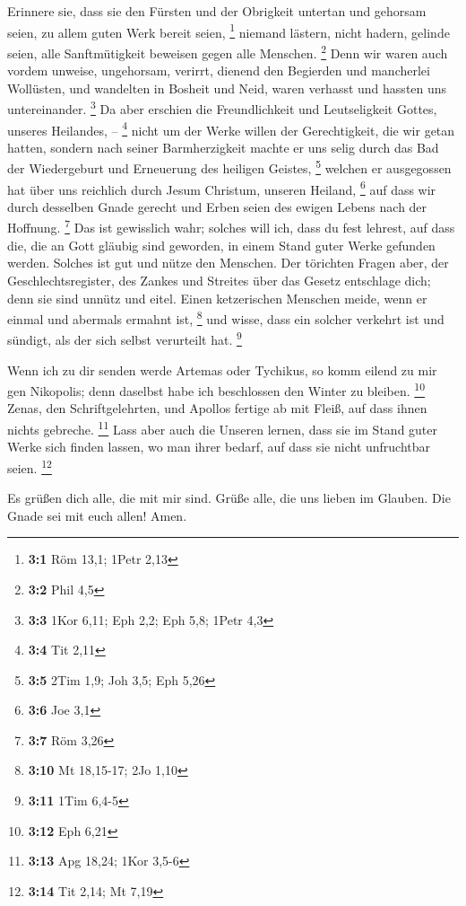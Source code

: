  Erinnere sie, dass sie den Fürsten und der Obrigkeit
untertan und gehorsam seien, zu allem guten Werk bereit seien,
\footnote{\textbf{3:1} Röm 13,1; 1Petr 2,13}  niemand
lästern, nicht hadern, gelinde seien, alle Sanftmütigkeit beweisen gegen
alle Menschen. \footnote{\textbf{3:2} Phil 4,5}  Denn wir
waren auch vordem unweise, ungehorsam, verirrt, dienend den Begierden
und mancherlei Wollüsten, und wandelten in Bosheit und Neid, waren
verhasst und hassten uns untereinander. \footnote{\textbf{3:3} 1Kor
  6,11; Eph 2,2; Eph 5,8; 1Petr 4,3}  Da aber erschien die
Freundlichkeit und Leutseligkeit Gottes, unseres Heilandes, --
\footnote{\textbf{3:4} Tit 2,11}  nicht um der Werke willen
der Gerechtigkeit, die wir getan hatten, sondern nach seiner
Barmherzigkeit machte er uns selig durch das Bad der Wiedergeburt und
Erneuerung des heiligen Geistes, \footnote{\textbf{3:5} 2Tim 1,9; Joh
  3,5; Eph 5,26}  welchen er ausgegossen hat über uns
reichlich durch Jesum Christum, unseren Heiland, \footnote{\textbf{3:6}
  Joe 3,1}  auf dass wir durch desselben Gnade gerecht und
Erben seien des ewigen Lebens nach der Hoffnung. \footnote{\textbf{3:7}
  Röm 3,26}  Das ist gewisslich wahr; solches will ich, dass
du fest lehrest, auf dass die, die an Gott gläubig sind geworden, in
einem Stand guter Werke gefunden werden. Solches ist gut und nütze den
Menschen.  Der törichten Fragen aber, der
Geschlechtsregister, des Zankes und Streites über das Gesetz entschlage
dich; denn sie sind unnütz und eitel.  Einen ketzerischen
Menschen meide, wenn er einmal und abermals ermahnt ist, \footnote{\textbf{3:10}
  Mt 18,15-17; 2Jo 1,10}  und wisse, dass ein solcher
verkehrt ist und sündigt, als der sich selbst verurteilt hat.
\footnote{\textbf{3:11} 1Tim 6,4-5}

 Wenn ich zu dir senden werde Artemas oder Tychikus, so
komm eilend zu mir gen Nikopolis; denn daselbst habe ich beschlossen den
Winter zu bleiben. \footnote{\textbf{3:12} Eph 6,21} 
Zenas, den Schriftgelehrten, und Apollos fertige ab mit Fleiß, auf dass
ihnen nichts gebreche. \footnote{\textbf{3:13} Apg 18,24; 1Kor 3,5-6}
 Lass aber auch die Unseren lernen, dass sie im Stand guter
Werke sich finden lassen, wo man ihrer bedarf, auf dass sie nicht
unfruchtbar seien. \footnote{\textbf{3:14} Tit 2,14; Mt 7,19}

 Es grüßen dich alle, die mit mir sind. Grüße alle, die uns
lieben im Glauben. Die Gnade sei mit euch allen! Amen.
